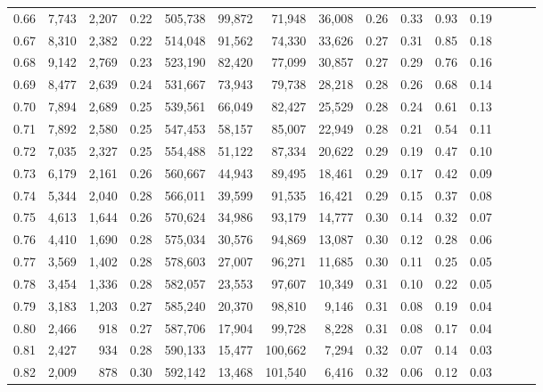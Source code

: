 \begin{tabular}{rrrrrrrrrrrrrrr}
0.66 &   7,743 &  2,207 &  0.22 &  505,738 &   99,872 &   71,948 &   36,008 &  0.26 &  0.33 &  0.93 &      0.19 \\
0.67 &   8,310 &  2,382 &  0.22 &  514,048 &   91,562 &   74,330 &   33,626 &  0.27 &  0.31 &  0.85 &      0.18 \\
0.68 &   9,142 &  2,769 &  0.23 &  523,190 &   82,420 &   77,099 &   30,857 &  0.27 &  0.29 &  0.76 &      0.16 \\
0.69 &   8,477 &  2,639 &  0.24 &  531,667 &   73,943 &   79,738 &   28,218 &  0.28 &  0.26 &  0.68 &      0.14 \\
0.70 &   7,894 &  2,689 &  0.25 &  539,561 &   66,049 &   82,427 &   25,529 &  0.28 &  0.24 &  0.61 &      0.13 \\
0.71 &   7,892 &  2,580 &  0.25 &  547,453 &   58,157 &   85,007 &   22,949 &  0.28 &  0.21 &  0.54 &      0.11 \\
0.72 &   7,035 &  2,327 &  0.25 &  554,488 &   51,122 &   87,334 &   20,622 &  0.29 &  0.19 &  0.47 &      0.10 \\
0.73 &   6,179 &  2,161 &  0.26 &  560,667 &   44,943 &   89,495 &   18,461 &  0.29 &  0.17 &  0.42 &      0.09 \\
0.74 &   5,344 &  2,040 &  0.28 &  566,011 &   39,599 &   91,535 &   16,421 &  0.29 &  0.15 &  0.37 &      0.08 \\
0.75 &   4,613 &  1,644 &  0.26 &  570,624 &   34,986 &   93,179 &   14,777 &  0.30 &  0.14 &  0.32 &      0.07 \\
0.76 &   4,410 &  1,690 &  0.28 &  575,034 &   30,576 &   94,869 &   13,087 &  0.30 &  0.12 &  0.28 &      0.06 \\
0.77 &   3,569 &  1,402 &  0.28 &  578,603 &   27,007 &   96,271 &   11,685 &  0.30 &  0.11 &  0.25 &      0.05 \\
0.78 &   3,454 &  1,336 &  0.28 &  582,057 &   23,553 &   97,607 &   10,349 &  0.31 &  0.10 &  0.22 &      0.05 \\
0.79 &   3,183 &  1,203 &  0.27 &  585,240 &   20,370 &   98,810 &    9,146 &  0.31 &  0.08 &  0.19 &      0.04 \\
0.80 &   2,466 &    918 &  0.27 &  587,706 &   17,904 &   99,728 &    8,228 &  0.31 &  0.08 &  0.17 &      0.04 \\
0.81 &   2,427 &    934 &  0.28 &  590,133 &   15,477 &  100,662 &    7,294 &  0.32 &  0.07 &  0.14 &      0.03 \\
0.82 &   2,009 &    878 &  0.30 &  592,142 &   13,468 &  101,540 &    6,416 &  0.32 &  0.06 &  0.12 &      0.03 \\

\end{tabular}

